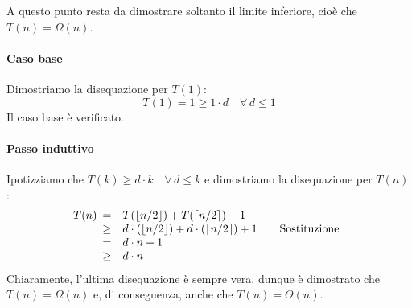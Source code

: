 \begin{eg}
    \bigskip\noindent
    A questo punto resta da dimostrare soltanto il limite inferiore,
    cioè che $T(n)=\Omega(n)$.
    \paragraph{Caso base} Dimostriamo la disequazione per $T(1)$:
    \[T(1)=1\geq 1\cdot d\quad\forall\,d\leq1\]
    Il caso base è verificato.

    \paragraph{Passo induttivo} Ipotizziamo che $T(k)\geq d\cdot k\quad\forall\,d\leq k$
    e dimostriamo la disequazione per $T(n)$:
    \[T(n)\begin{array}[t]{cll}
        = & T(\lfloor n/2\rfloor)+T(\lceil n/2\rceil)+1\\
        \geq & d\cdot(\lfloor n/2\rfloor)+d\cdot(\lceil n/2\rceil)+1 & \quad\text{Sostituzione}\\
        = & d\cdot n+1\\
        \geq & d\cdot n
    \end{array}\]
    Chiaramente, l'ultima disequazione è sempre vera, dunque è dimostrato che
    $T(n)=\Omega(n)$ e, di conseguenza, anche che $T(n)=\Theta(n)$.
\end{eg}
\
